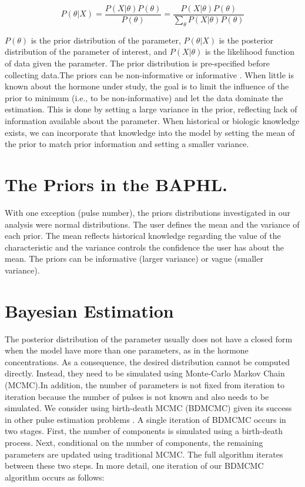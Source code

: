 \documentclass[11pt]{book}
\newcommand{\beq}{\begin{equation}}
\newcommand{\eeq}{\end{equation}}
\begin{document}
\beq
P(\theta|X)=\frac{P(X|\theta)P(\theta)}{P(\theta)} = \frac{P(X|\theta)P(\theta)}{\sum_\theta P(X|\theta)P(\theta)}
\eeq

$P(\theta)$ is the prior distribution of the parameter, $P(\theta|X)$ is the posterior distribution of the parameter of interest, and  $P(X|\theta)$ is the likelihood function of data given the parameter. The prior distribution is pre-specified before collecting data.The priors can be non-informative or informative .  When little is known about the hormone under study, the goal is to limit the influence of the prior to minimum (i.e., to be non-informative) and let the data dominate the estimation.  This is done by setting a large variance in the prior, reflecting lack of information available about the parameter.  When historical or biologic knowledge exists, we can incorporate that knowledge into the model by setting the mean of the prior to match prior information and setting a smaller variance.
\section{The Priors in the BAPHL.} \label{priors}
With one exception (pulse number), the priors distributions investigated in our analysis were normal distributions. The user defines the mean and the variance of each prior. The mean reflects historical knowledge regarding the value of the characteristic and the variance controls the confidence the user has about the mean. The priors can be informative (larger variance) or vague (smaller variance).
\section{Bayesian Estimation}

The posterior distribution of the parameter usually does not have a closed form  when the model have more than one parameters, as in the hormone concentrations. As a consequence, the desired distribution cannot be computed directly. Instead, they need to be simulated using Monte-Carlo Markov Chain (MCMC).In addition, the number of parameters is not fixed from iteration to iteration because the number of pulses is not known and also needs to be simulated. We consider using birth-death MCMC (BDMCMC) given its success in other pulse estimation problems . A single iteration of BDMCMC occurs in two stages. First, the number of components is simulated using a birth-death process. Next, conditional on the number of components, the remaining parameters are updated using traditional MCMC. The full algorithm iterates between these two steps.
In more detail, one iteration of our BDMCMC algorithm occurs as follows:
\end{document}
